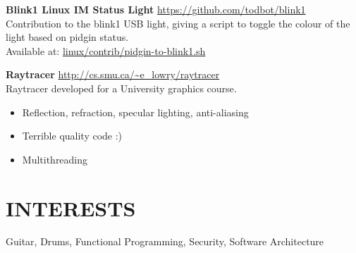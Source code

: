 \documentclass[line,margin]{res}
\begin{document}
\begin{resume}
\textbf{Blink1 Linux IM Status Light} \hfill \url{https://github.com/todbot/blink1} \\
Contribution to the blink1 USB light, giving a script to toggle the colour of the light based on pidgin status. \\
Available at: \href{https://github.com/todbot/blink1/blob/master/linux/contrib/pidgin-to-blink1.sh}{linux/contrib/pidgin-to-blink1.sh}

\textbf{Raytracer} \hfill \url{http://cs.smu.ca/~e_lowry/raytracer} \\
Raytracer developed for a University graphics course.
\begin{itemize} \itemsep-2pt
    \item Reflection, refraction, specular lighting, anti-aliasing
    \item Terrible quality code :)
    \item Multithreading
\end{itemize}

\section{INTERESTS}
Guitar, Drums, Functional Programming, Security, Software Architecture

\end{resume}
\end{document}

